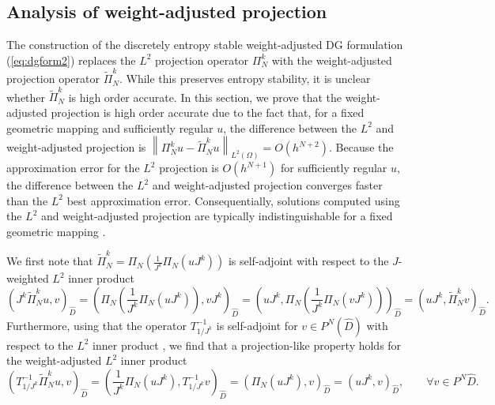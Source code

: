 \documentclass[10pt]{amsart}
\theoremstyle{definition}
\theoremstyle{lemma}
\theoremstyle{theorem}
\theoremstyle{assumption}
\renewcommand{\hat}{\widehat}
\renewcommand{\tilde}{\widetilde}
\newcommand{\nor}[1]{\left\| #1 \right\|}
\newcommand{\LRp}[1]{\left( #1 \right)}
\begin{document}
{\subsection{Analysis of weight-adjusted projection} 

The construction of the discretely entropy stable weight-adjusted DG formulation (\ref{eq:dgform2}) replaces the $L^2$ projection operator $\Pi_N^k$ with the weight-adjusted projection operator $\tilde{\Pi}^k_N$.
While this preserves entropy stability, it is unclear whether $\tilde{\Pi}^k_N$ is high order accurate.  In this section, we prove that the weight-adjusted projection is high order accurate due to the fact that, for a fixed geometric mapping and sufficiently regular $u$, the difference between the $L^2$ and weight-adjusted projection is $\nor{\Pi_N^k u - \tilde{\Pi}^k_N  u}_{L^2\LRp{\Omega}} = O(h^{N+2})$.  Because the approximation error for the $L^2$ projection is $O(h^{N+1})$ for sufficiently regular $u$, the difference between the $L^2$ and weight-adjusted projection converges faster than the $L^2$ best approximation error.  Consequentially, solutions computed using the $L^2$ and weight-adjusted projection are typically indistinguishable for a fixed geometric mapping \cite{chan2018multi}.  

We first note that $\tilde{\Pi}^k_N  = \Pi_N\LRp{\frac{1}{J^k}\Pi_N\LRp{uJ^k}}$ is self-adjoint with respect to the $J$-weighted $L^2$ inner product
\begin{equation}
  \LRp{J^k \tilde{\Pi}^k_N  u, v}_{\hat{D}} = \LRp{\Pi_N\LRp{\frac{1}{J^k}\Pi_N\LRp{uJ^k}}, vJ^k}_{\hat{D}} = \LRp{uJ^k, \Pi_N\LRp{\frac{1}{J^k}\Pi_N\LRp{vJ^k}}}_{\hat{D}} =  \LRp{uJ^k, \tilde{\Pi}^k_N  v}_{\hat{D}}.
\label{eq:PNsym}
\end{equation}
Furthermore, using that the operator $T_{1/J^k}^{-1}$ is self-adjoint for $v \in P^N\LRp{\hat{D}}$ with respect to the $L^2$ inner product \cite{chan2016weight1}, we find that a projection-like property holds for the weight-adjusted $L^2$ inner product
\begin{equation}
  \LRp{T_{1/J^k}^{-1} \tilde{\Pi}^k_N  u,v}_{\hat{D}} = \LRp{ \frac{1}{J^k}\Pi_N(uJ^k),T_{1/J^k}^{-1}v}_{\hat{D}} = \LRp{\Pi_N(u J^k),v}_{\hat{D}} = \LRp{u J^k,v}_{\hat{D}}, \qquad \forall v\in P^N{\hat{D}}.
\label{eq:PNproj}
\end{equation}

}
\end{document}
